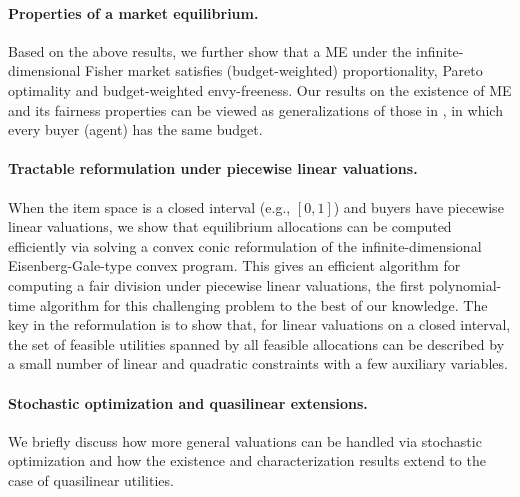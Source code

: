 \paragraph{Properties of a market equilibrium.} 
Based on the above results, we further show that a ME under the infinite-dimensional Fisher market satisfies (budget-weighted) proportionality, Pareto optimality and budget-weighted envy-freeness. Our results on the existence of ME and its fairness properties can be viewed as generalizations of those in \citet{weller1985fair}, in which every buyer (agent) has the same budget.

\paragraph{Tractable reformulation under piecewise linear valuations.} 
When the item space is a closed interval (e.g., $[0,1]$) and buyers have piecewise linear valuations, we show that equilibrium allocations can be computed efficiently via solving a convex conic reformulation of the infinite-dimensional Eisenberg-Gale-type convex program. %
This gives an efficient algorithm for computing a fair division under piecewise linear valuations, the first polynomial-time algorithm for this challenging problem to the best of our knowledge.
The key in the reformulation is to show that, for linear valuations on a closed interval, the set of feasible utilities spanned by all feasible allocations can be described by a small number of linear and quadratic constraints with a few auxiliary variables.

\paragraph{Stochastic optimization and quasilinear extensions.} 
We briefly discuss how more general valuations can be handled via stochastic optimization and how the existence and characterization results extend to the case of quasilinear utilities.


